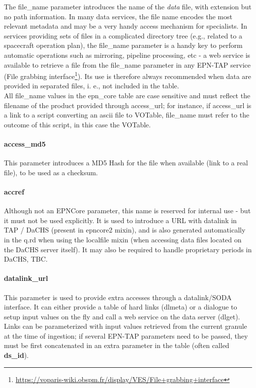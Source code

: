 \documentclass[11pt,a4paper]{ivoa}
\begin{document}
The file\_name parameter introduces the name of the \emph{data} file, with extension but no path information. In many data services, the file name encodes the most relevant metadata and may be a very handy access mechanism for specialists. In services providing sets of files in a complicated directory tree (e.g., related to a spacecraft operation plan), the file\_name parameter is a handy key to perform automatic operations such as mirroring, pipeline processing, etc - a web service is available to retrieve a file from the file\_name parameter in any EPN-TAP service (File grabbing interface\footnote{\url{https://voparis-wiki.obspm.fr/display/VES/File+grabbing+interface}}). Its use is therefore always recommended when data are provided in separated files, i. e., not included in the table.\\All file\_name values in the epn\_core table are case sensitive and must reflect the filename of the product provided through access\_url; for instance, if access\_url is a link to a script converting an ascii file to VOTable, file\_name must refer to the outcome of this script, in this case the VOTable.

\paragraph{access\_md5}

This parameter introduces a MD5 Hash for the file when available (link to a real file), to be used as a checksum.\\

\paragraph{accref}

Although not an EPNCore parameter, this name is reserved for internal use - but it must not be used explicitly. It is used to introduce a URL with datalink in TAP / DaCHS (present in epncore2 mixin), and is also generated automatically in the q.rd when using the localfile mixin (when accessing data files located on the DaCHS server itself). It may also be required to handle proprietary periods in DaCHS, TBC. \\

\paragraph{datalink\_url}

This parameter is used to provide extra accesses through a datalink/SODA interface. It can either provide a table of hard links (dlmeta) or a dialogue to setup input values on the fly and  call a web service on the data server (dlget). Links can be parameterized with input values retrieved from the current granule at the time of ingestion; if several EPN-TAP parameters need to be passed, they must be first concatenated in an extra parameter in the table (often called \textbf{ds\_id}).
\end{document}
